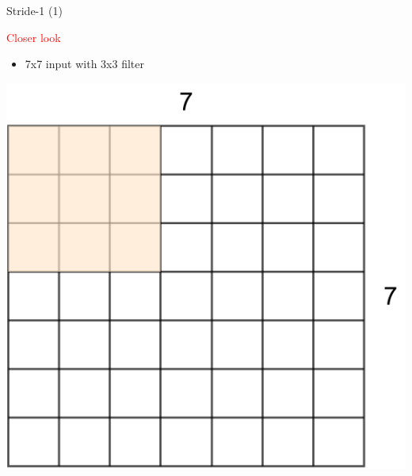 \documentclass[default, aspectratio=169]{beamer}
\begin{document}
	
	\begin{frame}{Stride-1 (1)}
		\vspace{0.5cm}
		
		\normalsize \textcolor{red}{Closer look}
		\begin{itemize}
			\item 7x7 input with 3x3 filter
		\end{itemize}
		
		\centering
		\includegraphics[keepaspectratio, scale=0.25]{pic/Stride1.png}
	\end{frame}
\end{document}
